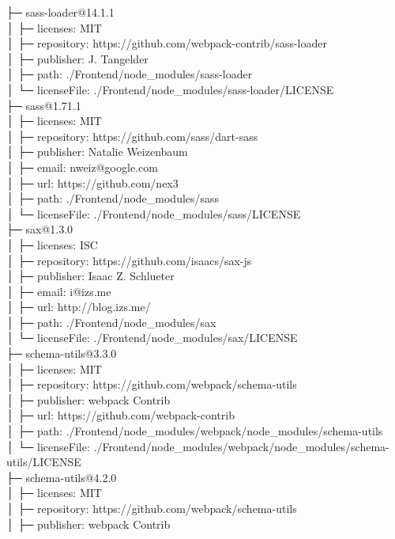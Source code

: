 ├─ sass-loader@14.1.1\\
│  ├─ licenses: MIT\\
│  ├─ repository: https://github.com/webpack-contrib/sass-loader\\
│  ├─ publisher: J. Tangelder\\
│  ├─ path: ./Frontend/node\_modules/sass-loader\\
│  └─ licenseFile: ./Frontend/node\_modules/sass-loader/LICENSE\\
├─ sass@1.71.1\\
│  ├─ licenses: MIT\\
│  ├─ repository: https://github.com/sass/dart-sass\\
│  ├─ publisher: Natalie Weizenbaum\\
│  ├─ email: nweiz@google.com\\
│  ├─ url: https://github.com/nex3\\
│  ├─ path: ./Frontend/node\_modules/sass\\
│  └─ licenseFile: ./Frontend/node\_modules/sass/LICENSE\\
├─ sax@1.3.0\\
│  ├─ licenses: ISC\\
│  ├─ repository: https://github.com/isaacs/sax-js\\
│  ├─ publisher: Isaac Z. Schlueter\\
│  ├─ email: i@izs.me\\
│  ├─ url: http://blog.izs.me/\\
│  ├─ path: ./Frontend/node\_modules/sax\\
│  └─ licenseFile: ./Frontend/node\_modules/sax/LICENSE\\
├─ schema-utils@3.3.0\\
│  ├─ licenses: MIT\\
│  ├─ repository: https://github.com/webpack/schema-utils\\
│  ├─ publisher: webpack Contrib\\
│  ├─ url: https://github.com/webpack-contrib\\
│  ├─ path: ./Frontend/node\_modules/webpack/node\_modules/schema-utils\\
│  └─ licenseFile: ./Frontend/node\_modules/webpack/node\_modules/schema-utils/LICENSE\\
├─ schema-utils@4.2.0\\
│  ├─ licenses: MIT\\
│  ├─ repository: https://github.com/webpack/schema-utils\\
│  ├─ publisher: webpack Contrib\\
